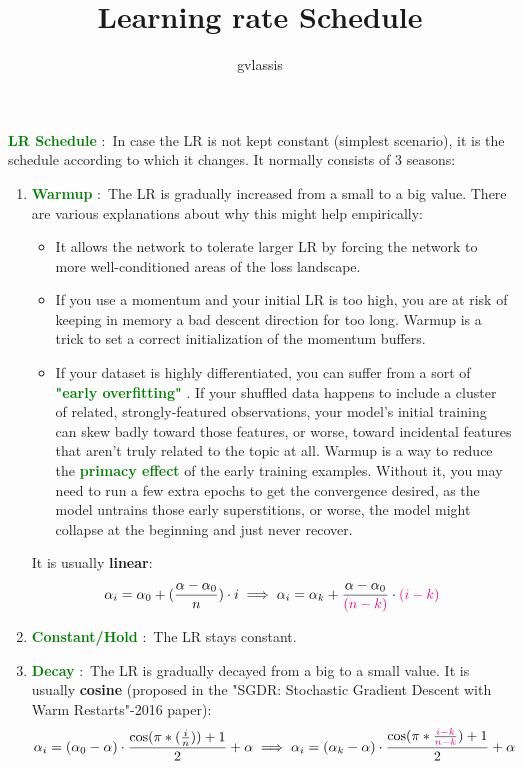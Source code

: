 \documentclass{article}
\title{Learning rate Schedule}
\author{gvlassis}
\date{}
\newcommand{\define}[1]{
    \textcolor{green}{\textbf{#1}}
}
\begin{document}
\maketitle

\define{LR Schedule}:\ In case the LR is not kept constant (simplest scenario), it is the schedule according to which it changes. It normally consists of 3 seasons:

\begin{enumerate}
    \item
        \define{Warmup}:\ The LR is gradually increased from a small to a big value. There are various explanations about why this might help empirically:
        \begin{itemize}
            \item It allows the network to tolerate larger LR by forcing the network to more well-conditioned areas of the loss landscape.
            \item If you use a momentum and your initial LR is too high, you are at risk of keeping in memory a bad descent direction for too long. Warmup is a trick to set a correct initialization of the momentum buffers.
            \item If your dataset is highly differentiated, you can suffer from a sort of \define{"early overfitting"}. If your shuffled data happens to include a cluster of related, strongly-featured observations, your model's initial training can skew badly toward those features, or worse, toward incidental features that aren't truly related to the topic at all. Warmup is a way to reduce the \define{primacy effect} of the early training examples. Without it, you may need to run a few extra epochs to get the convergence desired, as the model untrains those early superstitions, or worse, the model might collapse at the beginning and just never recover.
        \end{itemize}
        It is usually \textbf{linear}:
        \begin{gather*}
            \alpha_i = \alpha_0 + (\frac{\alpha-\alpha_0}{n}) \cdot i \implies \alpha_i = \alpha_k + \frac{\alpha-\alpha_0}{\textcolor{magenta}{(n-k)}} \cdot \textcolor{magenta}{(i-k)}
        \end{gather*}
    \item \define{Constant/Hold}:\ The LR stays constant.
    \item 
        \define{Decay}:\ The LR is gradually decayed from a big to a small value. It is usually \textbf{cosine} (proposed in the "SGDR: Stochastic Gradient Descent with Warm Restarts"-2016 paper):
        \begin{gather*}
            \alpha_i = (\alpha_0-\alpha) \cdot \frac{\cos(\pi*(\frac{i}{n}))+1}{2} + \alpha \implies \alpha_i = (\alpha_k-\alpha) \cdot \frac{\cos(\pi*\frac{\textcolor{magenta}{i-k}}{\textcolor{magenta}{n-k}})+1}{2} + \alpha
        \end{gather*}
\end{enumerate}
\end{document}
